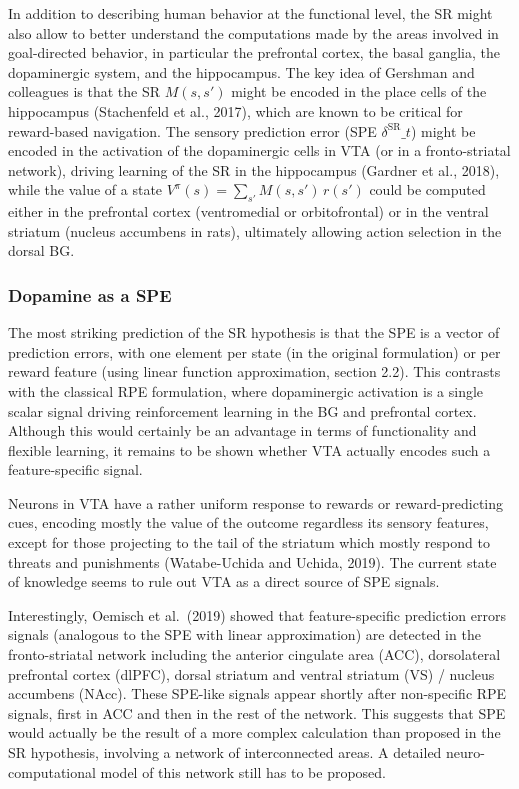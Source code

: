 \documentclass[
  11pt,
]{article}
\begin{document}
In addition to describing human behavior at the functional level, the SR
might also allow to better understand the computations made by the areas
involved in goal-directed behavior, in particular the prefrontal cortex,
the basal ganglia, the dopaminergic system, and the hippocampus. The key
idea of Gershman and colleagues is that the SR \(M(s, s')\) might be
encoded in the place cells of the hippocampus (Stachenfeld et al.,
2017), which are known to be critical for reward-based navigation. The
sensory prediction error (SPE \(\delta^\text{SR}\_t\)) might be encoded
in the activation of the dopaminergic cells in VTA (or in a
fronto-striatal network), driving learning of the SR in the hippocampus
(Gardner et al., 2018), while the value of a state
\(V^\pi(s) = \sum_{s'} M(s, s') \, r(s')\) could be computed either in
the prefrontal cortex (ventromedial or orbitofrontal) or in the ventral
striatum (nucleus accumbens in rats), ultimately allowing action
selection in the dorsal BG.

\hypertarget{dopamine-as-a-spe}{%
\subsubsection{Dopamine as a SPE}\label{dopamine-as-a-spe}}

The most striking prediction of the SR hypothesis is that the SPE is a
vector of prediction errors, with one element per state (in the original
formulation) or per reward feature (using linear function approximation,
section 2.2). This contrasts with the classical RPE formulation, where
dopaminergic activation is a single scalar signal driving reinforcement
learning in the BG and prefrontal cortex. Although this would certainly
be an advantage in terms of functionality and flexible learning, it
remains to be shown whether VTA actually encodes such a feature-specific
signal.

Neurons in VTA have a rather uniform response to rewards or
reward-predicting cues, encoding mostly the value of the outcome
regardless its sensory features, except for those projecting to the tail
of the striatum which mostly respond to threats and punishments
(Watabe-Uchida and Uchida, 2019). The current state of knowledge seems
to rule out VTA as a direct source of SPE signals.

Interestingly, Oemisch et al.~(2019) showed that feature-specific
prediction errors signals (analogous to the SPE with linear
approximation) are detected in the fronto-striatal network including the
anterior cingulate area (ACC), dorsolateral prefrontal cortex (dlPFC),
dorsal striatum and ventral striatum (VS) / nucleus accumbens (NAcc).
These SPE-like signals appear shortly after non-specific RPE signals,
first in ACC and then in the rest of the network. This suggests that SPE
would actually be the result of a more complex calculation than proposed
in the SR hypothesis, involving a network of interconnected areas. A
detailed neuro-computational model of this network still has to be
proposed.
\end{document}
